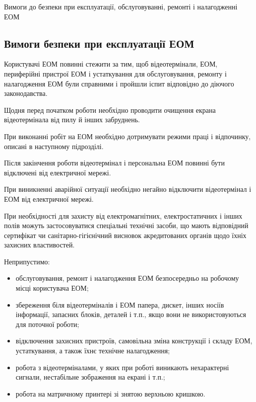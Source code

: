 \documentclass[simple,a4paper,14pt,ukrainian,utf8]{eskdtext}
\begin{document}
\begin{appendices}
                Вимоги до безпеки при експлуатації, обслуговуванні, ремонті і налагодженні ЕОМ

            \subsection{Вимоги безпеки при експлуатації ЕОМ}

                Користувачі ЕОМ повинні стежити за тим, щоб відеотермінали, ЕОМ, периферійні пристрої ЕОМ і устаткування для обслуговування, ремонту і налагодження ЕОМ були справними і пройшли іспит відповідно до діючого законодавства.

                Щодня перед початком роботи необхідно проводити очищення екрана відеотермінала від пилу й інших забруднень.

                При виконанні робіт на ЕОМ необхідно дотримувати режими праці і відпочинку, описані в наступному підрозділі.

                Після закінчення роботи відеотермінал і персональна ЕОМ повинні бути відключені від електричної мережі.

                При виникненні аварійної ситуації необхідно негайно відключити відеотермінал і ЕОМ від електричної мережі.

                При необхідності для захисту від електромагнітних, електростатичних і інших полів можуть застосовуватися спеціальні технічні засоби, що мають відповідний сертифікат чи санітарно-гігієнічний висновок акредитованих органів щодо їхніх захисних властивостей.

                Неприпустимо:

                \begin{itemize}
                    \item обслуговування, ремонт і налагодження ЕОМ безпосередньо на робочому місці користувача ЕОМ;
                    \item збереження біля відеотерміналів і ЕОМ папера, дискет, інших носіїв інформації, запасних блоків, деталей і т.п., якщо вони не використовуються для поточної роботи;
                    \item відключення захисних пристроїв, самовільна зміна конструкції і складу ЕОМ, устаткування, а також їхнє технічне налагодження;
                    \item робота з відеотерміналами, у яких при роботі виникають нехарактерні сигнали, нестабільне зображення на екрані і т.п.;
                    \item робота на матричному принтері зі знятою верхньою кришкою.
                \end{itemize}


\end{appendices}
\end{document}

